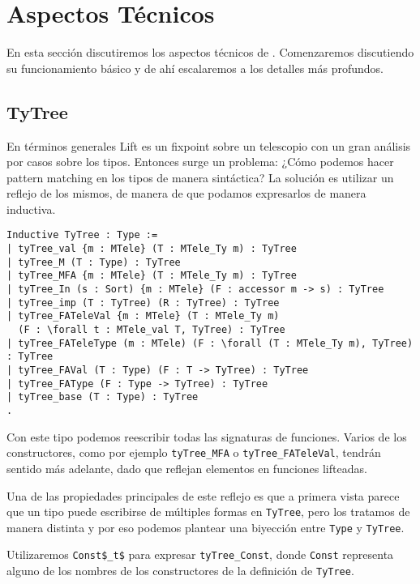 \section{Aspectos Técnicos}

En esta sección discutiremos los aspectos técnicos de \lift.
Comenzaremos discutiendo su funcionamiento básico y de ahí escalaremos a los detalles más profundos. 

\subsection{TyTree}

En términos generales Lift es un fixpoint sobre un telescopio con un gran análisis por casos sobre los tipos.
Entonces surge un problema: ¿Cómo podemos hacer pattern matching en los tipos de manera sintáctica?
La solución es utilizar un reflejo de los mismos, de manera de que podamos expresarlos de manera inductiva.

\begin{lstlisting}
Inductive TyTree : Type :=
| tyTree_val {m : MTele} (T : MTele_Ty m) : TyTree
| tyTree_M (T : Type) : TyTree
| tyTree_MFA {m : MTele} (T : MTele_Ty m) : TyTree
| tyTree_In (s : Sort) {m : MTele} (F : accessor m -> s) : TyTree
| tyTree_imp (T : TyTree) (R : TyTree) : TyTree
| tyTree_FATeleVal {m : MTele} (T : MTele_Ty m)
  (F : \forall t : MTele_val T, TyTree) : TyTree
| tyTree_FATeleType (m : MTele) (F : \forall (T : MTele_Ty m), TyTree) : TyTree
| tyTree_FAVal (T : Type) (F : T -> TyTree) : TyTree
| tyTree_FAType (F : Type -> TyTree) : TyTree
| tyTree_base (T : Type) : TyTree
.
\end{lstlisting}

Con este tipo podemos reescribir todas las signaturas de funciones. Varios de los constructores, como por ejemplo
\lstinline{tyTree_MFA} o \lstinline{tyTree_FATeleVal}, tendrán sentido más adelante, dado que reflejan elementos en
funciones lifteadas.

Una de las propiedades principales de este reflejo es que a primera vista parece que un tipo puede escribirse de múltiples formas en \lstinline{TyTree}, pero los tratamos de manera distinta y por eso podemos plantear una biyección
entre \lstinline{Type} y \lstinline{TyTree}.

Utilizaremos \lstinline{Const$_t$} para expresar \lstinline{tyTree_Const}, donde \lstinline{Const} representa alguno de los nombres de los constructores de la definición de \lstinline{TyTree}. 

